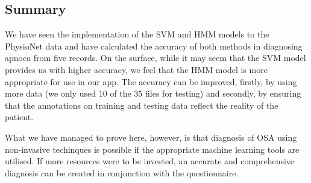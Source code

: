 \subsection{Summary}
\label{sec:mlExperimentsSummary}

We have seen the implementation of the SVM and HMM models to the PhysioNet data and have calculated the accuracy of both methods in diagnosing apnoea from five records. On the surface, while it may seem that the SVM model provides us with higher accuracy, we feel that the HMM model is more appropriate for use in our app. The accuracy can be improved, firstly, by using more data (we only used 10 of the 35 files for testing) and secondly, by ensuring that the annotations on training and testing data reflect the reality of the patient.

What we have managed to prove here, however, is that diagnosis of OSA using non-invasive techinques is possible if the appropriate machine learning tools are utilised. If more resources were to be invested, an accurate and comprehensive diagnosis can be created in conjunction with the questionnaire.